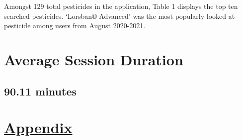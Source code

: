 \documentclass[
]{article}
\begin{document}
Amongst 129 total pesticides in the application, Table 1 displays the
top ten searched pesticides. `Lorsban® Advanced' was the most popularly
looked at pesticide among users from August 2020-2021.

\hypertarget{average-session-duration}{%
\section{Average Session Duration}\label{average-session-duration}}

\hypertarget{minutes}{%
\subsection{90.11 minutes}\label{minutes}}

\hypertarget{appendix}{%
\section{\texorpdfstring{\href{https://github.com/aartitandon/SURE-EH-Research-Project/blob/main/Appendix.md}{Appendix}}{Appendix}}\label{appendix}}
\end{document}
